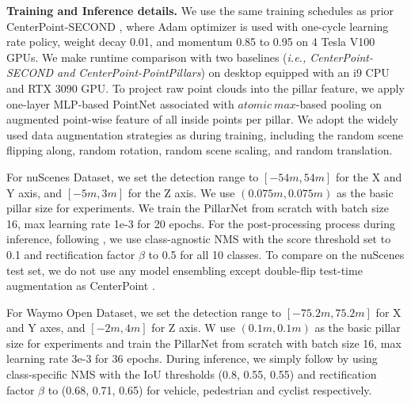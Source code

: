 \documentclass[runningheads]{llncs}
\begin{document}
{\flushleft \bf Training and Inference details.}
We use the same training schedules as prior CenterPoint-SECOND \cite{yin2021center}, where Adam optimizer is used with one-cycle learning rate policy, weight decay 0.01, and momentum 0.85 to 0.95 on 4 Tesla V100 GPUs.
We make runtime comparison with two baselines (\textit{i.e., CenterPoint-SECOND and CenterPoint-PointPillars}) on desktop equipped with an i9 CPU and RTX 3090 GPU.
To project raw point clouds into the pillar feature, we apply one-layer MLP-based PointNet associated with $atomic \ max$-based pooling on augmented point-wise feature of all inside points per pillar.
We adopt the widely used data augmentation strategies as \cite{yin2021center} during training, including the random scene flipping along, random rotation, random scene scaling, and random translation.



For nuScenes Dataset, 
we set the detection range to $[-54m, 54m]$ for the X and Y axis, and $[-5m, 3m]$ for the Z axis. 
We use $(0.075m, 0.075m)$ as the basic pillar size for experiments.
We train the PillarNet from scratch with batch size 16, max learning rate 1e-3 for 20 epochs.
For the post-processing process during inference, following \cite{yin2021center}, we use class-agnostic NMS with the score threshold set to 0.1 and rectification factor $\beta$ to 0.5 for all 10 classes.
To compare on the nuScenes test set, we do not use any model ensembling except double-flip test-time augmentation as CenterPoint \cite{yin2021center}.

For Waymo Open Dataset, 
we set the detection range to $[-75.2m, 75.2m]$ for X and Y axes, and $[-2m, 4m]$ for Z axis.
W use $(0.1m, 0.1m)$ as the basic pillar size for experiments and train the PillarNet from scratch with batch size 16, max learning rate 3e-3 for 36 epochs.
During inference, we simply follow \cite{Hu2021AFDetV2RT} by using class-specific NMS with the IoU thresholds (0.8, 0.55, 0.55) and rectification factor $\beta$ to (0.68, 0.71, 0.65) for vehicle, pedestrian and cyclist respectively.
\end{document}
